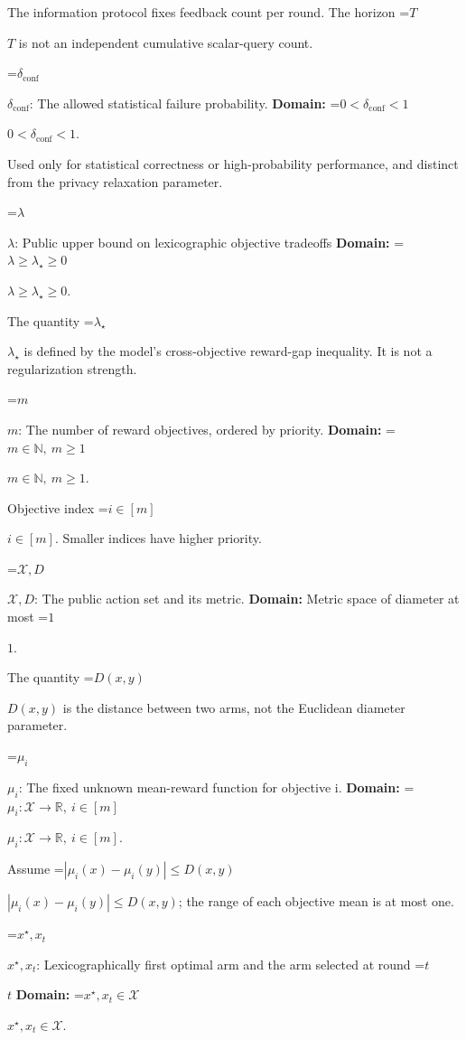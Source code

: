 \documentclass[10pt,a4paper]{article}
\newcommand{\AtlasMath}[1]{\par\begingroup\centering\setbox0=\hbox{$\displaystyle #1$}\ifdim\wd0>1.4\linewidth\typeout{ATLAS WIDE FORMULA: \the\wd0}\fi\ifdim\wd0>\linewidth\resizebox{\linewidth}{!}{\box0}\else\box0\fi\par\endgroup}
\newcommand{\AtlasInlineMath}[1]{\begingroup\setbox0=\hbox{$#1$}\ifdim\wd0>.4\linewidth\endgroup\AtlasMath{#1}\else\endgroup$#1$\fi}
\begin{document}
The information protocol fixes feedback count per round. The horizon \AtlasInlineMath{T} is not an independent cumulative scalar-query count.



\AtlasInlineMath{\delta_{\mathrm{conf}}}: The allowed statistical failure probability. \textbf{Domain:} \AtlasInlineMath{0<\delta_{\mathrm{conf}}<1}.



Used only for statistical correctness or high-probability performance, and distinct from the privacy relaxation parameter.



\AtlasInlineMath{\lambda}: Public upper bound on lexicographic objective tradeoffs \textbf{Domain:} \AtlasInlineMath{\lambda\ge\lambda_\star\ge0}.



The quantity \AtlasInlineMath{\lambda_\star} is defined by the model’s cross-objective reward-gap inequality. It is not a regularization strength.



\AtlasInlineMath{m}: The number of reward objectives, ordered by priority. \textbf{Domain:} \AtlasInlineMath{m\in\mathbb N,\ m\ge1}.



Objective index \AtlasInlineMath{i\in[m]}. Smaller indices have higher priority.



\AtlasInlineMath{\mathcal X,D}: The public action set and its metric. \textbf{Domain:} Metric space of diameter at most \AtlasInlineMath{1}.



The quantity \AtlasInlineMath{D(x,y)} is the distance between two arms, not the Euclidean diameter parameter.



\AtlasInlineMath{\mu_i}: The fixed unknown mean-reward function for objective i. \textbf{Domain:} \AtlasInlineMath{\mu_i:\mathcal X\to\mathbb R,\ i\in[m]}.



Assume \AtlasInlineMath{|\mu_i(x)-\mu_i(y)|\le D(x,y)}; the range of each objective mean is at most one.



\AtlasInlineMath{x^\star,x_t}: Lexicographically first optimal arm and the arm selected at round \AtlasInlineMath{t} \textbf{Domain:} \AtlasInlineMath{x^\star,x_t\in\mathcal X}.
\end{document}
